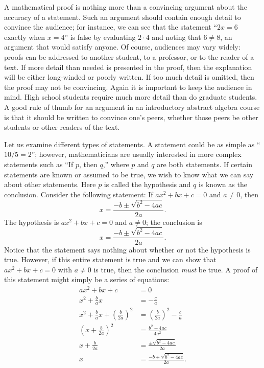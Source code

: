 A {\bfi mathematical proof\/} is nothing more than a convincing argument about the accuracy  of a statement. Such an argument should contain enough detail to convince the audience; for instance, we can see that the statement ``$2x=6$ exactly when $x = 4$'' is false by evaluating $2 \cdot 4$ and noting that $6 \neq 8$, an argument that would satisfy anyone. Of course, audiences may vary widely: proofs can be addressed to another student, to a professor, or to the reader of a text.  If more detail than  needed is presented in the proof, then the  explanation will be either long-winded or poorly written.  If too much detail is omitted, then the proof may  not be convincing.  Again it is important to keep the audience in mind.  High school students require much more detail than do graduate students.  A good rule of thumb for an argument in an introductory abstract algebra course is that it should be written to convince one's peers, whether those peers be other students or other readers of the text. 

Let us examine different types of statements.  A statement could be as simple as ``$10/5 = 2$''; however, mathematicians are usually interested in more complex statements such as ``If $p$, then $q$,'' where $p$ and $q$ are both statements.  If certain statements are known or assumed to be true, we wish to know what we can say about other statements.  Here $p$ is called the {\bfi hypothesis\/} and $q$ is known as the {\bfi conclusion}.  Consider the following statement: If $ax^2 + bx + c = 0$ and $a \neq 0$, then  
\[
x = \frac{-b \pm \sqrt{b^2 - 4ac}}{2a}.
\]
The hypothesis is $ax^2 + bx + c = 0$ and $a \neq 0$; the conclusion is 
\[
x = \frac{-b \pm \sqrt{b^2 - 4ac}}{2a}.
\]
Notice that the  statement says nothing about whether or not the hypothesis is true. However, if this entire statement is true and we can show that $ax^2 + bx + c = 0$ with $a \neq 0$ is true, then the conclusion {\em must\/} be true.  A proof of this statement might simply be a series of equations: 
\begin{align*}
ax^2 + bx + c & =  0 \\
x^2 + \frac{b}{a}x & =  - \frac{c}{a} \\
x^2 + \frac{b}{a}x + \left( \frac{b}{2a} \right)^2 & =  \left( \frac{b}{2a} \right)^2 - \frac{c}{a} \\
\left(x + \frac{b}{2a} \right)^2 & =  \frac{b^2 - 4ac}{4a^2} \\
x + \frac{b}{2a}  & =  \frac{ \pm \sqrt{ b^2 -4ac}}{2a} \\
x & =  \frac{-b \pm \sqrt{b^2 - 4ac}}{2a}.
\end{align*}

